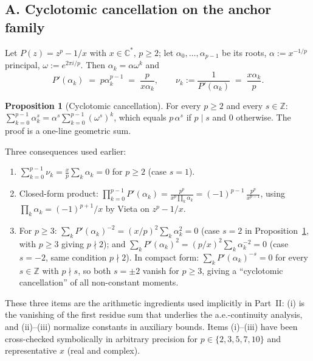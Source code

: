 \documentclass[11pt,a4paper]{article}
\theoremstyle{definition}
\newtheorem{proposition}{Proposition}[section]
\begin{document}
\subsection*{A. Cyclotomic cancellation on the anchor family}

Let $P(z) = z^p - 1/x$ with $x \in \mathbb{C}^\ast$, $p \geq 2$; let $\alpha_0, \ldots, \alpha_{p-1}$ be its roots, $\alpha := x^{-1/p}$ principal, $\omega := e^{2\pi i/p}$. Then $\alpha_k = \alpha\omega^k$ and
\[
  P'(\alpha_k) \;=\; p\alpha_k^{p-1} \;=\; \frac{p}{x\alpha_k},
  \qquad
  \nu_k := \frac{1}{P'(\alpha_k)} \;=\; \frac{x\alpha_k}{p}.
\]

\begin{proposition}[Cyclotomic cancellation]\label{prop:cyclotomic-cancellation}
For every $p \geq 2$ and every $s \in \mathbb{Z}$: $\sum_{k=0}^{p-1}\alpha_k^s = \alpha^s \sum_{k=0}^{p-1}(\omega^s)^k$, which equals $p\,\alpha^s$ if $p \mid s$ and $0$ otherwise. The proof is a one-line geometric sum.
\end{proposition}

Three consequences used earlier:
\begin{enumerate}
  \item[(i)] $\displaystyle \sum_{k=0}^{p-1} \nu_k = \frac{x}{p}\sum_k \alpha_k = 0$ for $p \geq 2$ (case $s = 1$).
  \item[(ii)] Closed-form product: $\displaystyle \prod_{k=0}^{p-1} P'(\alpha_k) = \frac{p^p}{x^p \prod_k \alpha_k} = (-1)^{p-1}\,\frac{p^p}{x^{p-1}}$, using $\prod_k \alpha_k = (-1)^{p+1}/x$ by Vieta on $z^p - 1/x$.
  \item[(iii)] For $p \geq 3$: $\sum_k P'(\alpha_k)^{-2} = (x/p)^2 \sum_k \alpha_k^2 = 0$ (case $s = 2$ in Proposition~\ref{prop:cyclotomic-cancellation}, with $p \geq 3$ giving $p \nmid 2$); and $\sum_k P'(\alpha_k)^2 = (p/x)^2 \sum_k \alpha_k^{-2} = 0$ (case $s = -2$, same condition $p \nmid 2$). In compact form: $\sum_k P'(\alpha_k)^{-s} = 0$ for every $s \in \mathbb{Z}$ with $p \nmid s$, so both $s = \pm 2$ vanish for $p \geq 3$, giving a ``cyclotomic cancellation'' of all non-constant moments.
\end{enumerate}

These three items are the arithmetic ingredients used implicitly in Part~II: (i) is the vanishing of the first residue sum that underlies the a.e.-continuity analysis, and (ii)--(iii) normalize constants in auxiliary bounds. Items (i)--(iii) have been cross-checked symbolically in arbitrary precision for $p \in \{2, 3, 5, 7, 10\}$ and representative $x$ (real and complex).
\end{document}
